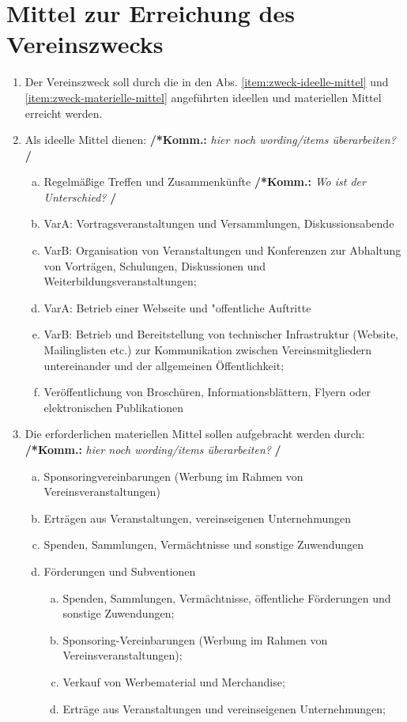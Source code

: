 \documentclass[a4paper,12pt]{article}
\newcommand{\comment}[1]{{\bf /*Komm.:} \textit{#1} {\bf */}}
\begin{document}
\section{Mittel zur Erreichung des Vereinszwecks}%
\label{sec:Mittel}
\begin{enumerate}
\item Der Vereinszweck soll durch die in den Abs. \ref{item:zweck-ideelle-mittel} und \ref{item:zweck-materielle-mittel} angeführten ideellen und materiellen Mittel erreicht werden.

\item\label{item:zweck-ideelle-mittel} Als ideelle Mittel dienen:
\comment{hier noch wording/items überarbeiten?}
\begin{enumerate}[(a)]
\item Regelmäßige Treffen und Zusammenkünfte \comment{Wo ist der Unterschied?}
\item VarA: Vortragsveranstaltungen und Versammlungen, Diskussionsabende
\item VarB: Organisation von Veranstaltungen und Konferenzen zur Abhaltung von Vorträgen, Schulungen, Diskussionen und Weiterbildungsveranstaltungen;
\item VarA: Betrieb einer Webseite und "offentliche Auftritte
\item VarB: Betrieb und Bereitstellung von technischer Infrastruktur (Website, Mailinglisten etc.) zur Kommunikation zwischen Vereinsmitgliedern untereinander und der allgemeinen Öffentlichkeit;
\item Veröffentlichung von Broschüren, Informationsblättern, Flyern oder elektronischen Publikationen

\end{enumerate}
\item\label{item:zweck-materielle-mittel} Die erforderlichen materiellen Mittel sollen aufgebracht werden durch:
\comment{hier noch wording/items überarbeiten?}
\begin{enumerate}[(a)]
\item Sponsoringvereinbarungen (Werbung im Rahmen von Vereinsveranstaltungen)
\item Erträgen aus Veranstaltungen, vereinseigenen Unternehmungen
\item Spenden, Sammlungen, Vermächtnisse und sonstige Zuwendungen
\item Förderungen und Subventionen

\begin{enumerate}[(a)]
\item Spenden, Sammlungen, Vermächtnisse, öffentliche Förderungen und sonstige Zuwendungen;
\item Sponsoring-Vereinbarungen (Werbung im Rahmen von Vereinsveranstaltungen);
\item Verkauf von Werbematerial und Merchandise;
\item Erträge aus Veranstaltungen und vereinseigenen Unternehmungen;
\end{enumerate}

\end{enumerate}
\end{enumerate}
\end{document}
